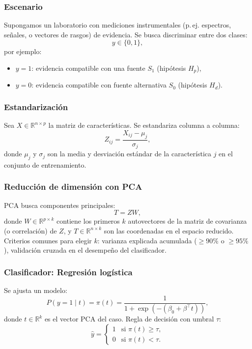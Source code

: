 \documentclass[a4paper,10pt,oneside]{article}
\begin{document}
\subsubsection*{Escenario}
Supongamos un laboratorio con mediciones instrumentales (p.\,ej. espectros, se\~nales, o vectores de rasgos) de evidencia. Se busca discriminar entre dos clases:
\[
y\in\{0,1\},
\]
por ejemplo:
\begin{itemize}
\item $y=1$: evidencia compatible con una fuente $S_1$ (hip\'otesis $H_p$),
\item $y=0$: evidencia compatible con fuente alternativa $S_0$ (hip\'otesis $H_d$).
\end{itemize}

\subsubsection*{Estandarizaci\'on}
Sea $X\in\mathbb{R}^{n\times p}$ la matriz de caracter\'isticas. Se estandariza columna a columna:
\[
Z_{ij}=\frac{X_{ij}-\mu_j}{\sigma_j},
\]
donde $\mu_j$ y $\sigma_j$ son la media y desviaci\'on est\'andar de la caracter\'istica $j$ en el conjunto de entrenamiento.

\subsubsection*{Reducci\'on de dimensi\'on con PCA}
PCA busca componentes principales:
\[
T = ZW,
\]
donde $W\in\mathbb{R}^{p\times k}$ contiene los primeros $k$ autovectores de la matriz de covarianza (o correlaci\'on) de $Z$, y $T\in\mathbb{R}^{n\times k}$ son las coordenadas en el espacio reducido. Criterios comunes para elegir $k$: varianza explicada acumulada ($\geq 90\%$ o $\geq 95\%$), validaci\'on cruzada en el desempe\~no del clasificador.

\subsubsection*{Clasificador: Regresi\'on log\'istica}
Se ajusta un modelo:
\[
P(y=1\mid t)=\pi(t)=\frac{1}{1+\exp\left(-(\beta_0+\beta^\top t)\right)},
\]
donde $t\in\mathbb{R}^k$ es el vector PCA del caso. Regla de decisi\'on con umbral $\tau$:
\[
\hat{y}=
\begin{cases}
1 & \text{si } \pi(t)\ge \tau,\\
0 & \text{si } \pi(t)< \tau.
\end{cases}
\]
\end{document}
